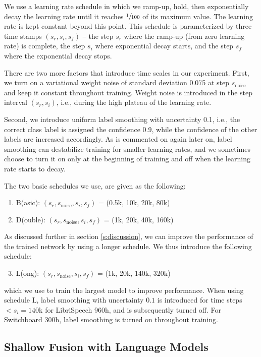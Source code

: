 We use a learning rate schedule in which we ramp-up, hold, then exponentially decay the learning rate until it reaches $\sfrac{1}{100}$ of its maximum value. The learning rate is kept constant beyond this point. This schedule is parameterized by three time stamps $(s_r, s_i, s_f)$ -- the step $s_r$ where the ramp-up (from zero learning rate) is complete, the step $s_i$ where exponential decay starts, and the step $s_f$ where the exponential decay stops.

There are two more factors that introduce time scales in our experiment. First, we turn on a variational weight noise \cite{graves-nips-2011} of standard deviation 0.075 at step $s_\text{noise}$ and keep it constant throughout training. Weight noise is introduced in the step interval $(s_r, s_i)$, i.e., during the high plateau of the learning rate.

Second, we introduce uniform label smoothing \cite{lbsm} with uncertainty 0.1, i.e., the correct class label is assigned the confidence 0.9, while the confidence of the other labels are increased accordingly. As is commented on again later on, label smoothing can destabilize training for smaller learning rates, and we sometimes choose to turn it on only at the beginning of training and off when the learning rate starts to decay.

The two basic schedules we use, are given as the following:
\begin{enumerate}
\item B(asic): $(s_r, s_\text{noise}, s_i, s_f)$ = (0.5k, 10k, 20k, 80k)
\item D(ouble): $(s_r, s_\text{noise}, s_i, s_f)$ = (1k, 20k, 40k, 160k)
\end{enumerate}
As discussed further in section \ref{s:discussion}, we can improve the performance of the trained network by using a longer schedule. We thus introduce the following schedule:
\begin{enumerate}
  \setcounter{enumi}{2}
  \item L(ong): $(s_r, s_\text{noise}, s_i, s_f)$ = (1k, 20k, 140k, 320k)
\end{enumerate}
which we use to train the largest model to improve performance. When using schedule L, label smoothing with uncertainty $0.1$ is introduced for time steps $< s_i = \text{140k}$ for LibriSpeech 960h, and is subsequently turned off. For Switchboard 300h, label smoothing is turned on throughout training.

\subsection{Shallow Fusion with Language Models}


